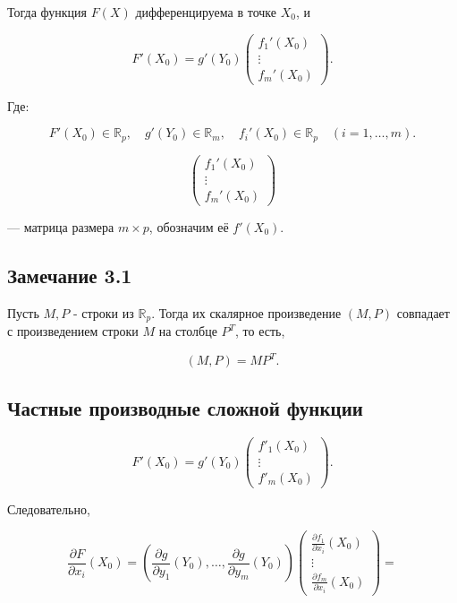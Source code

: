 {Тогда функция \( F(X) \) дифференцируема в точке \( X_0 \), и



\[
F'(X_0) = g'(Y_0) \begin{pmatrix} f_1'(X_0) \\ \vdots \\ f_m'(X_0) \end{pmatrix}.
\]



Где:



\[
F'(X_0) \in \mathbb{R}_p, \quad g'(Y_0) \in \mathbb{R}_m, \quad f_i'(X_0) \in \mathbb{R}_p \quad (i=1, \dots, m).
\]





\[
\begin{pmatrix} f_1'(X_0) \\ \vdots \\ f_m'(X_0) \end{pmatrix}
\]



— матрица размера \( m \times p \), обозначим её \( f'(X_0) \).

\subsection*{Замечание 3.1}

Пусть \( M, P \) - строки из \( \mathbb{R}_p \). Тогда их скалярное произведение \( (M, P) \) совпадает с произведением строки \( M \) на столбце \( P^T \), то есть, 



\[
(M, P) = M P^T.
\]


\subsection*{Частные производные сложной функции}



\[
F'(X_0) = g'(Y_0) \begin{pmatrix} f'_1(X_0) \\ \vdots \\ f'_m(X_0) \end{pmatrix}.
\]



Следовательно,



\[
\frac{\partial F}{\partial x_i}(X_0) = \left( \frac{\partial g}{\partial y_1}(Y_0), \ldots, \frac{\partial g}{\partial y_m}(Y_0) \right) \begin{pmatrix} \frac{\partial f_1}{\partial x_i}(X_0) \\ \vdots \\ \frac{\partial f_m}{\partial x_i}(X_0) \end{pmatrix} =
\]





}
